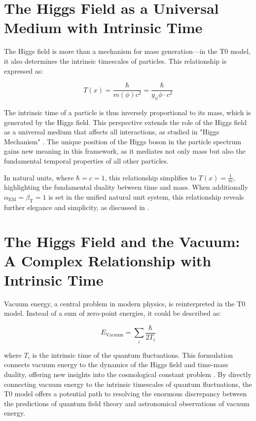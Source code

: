 \documentclass[a4paper,12pt]{article}
\newcommand{\Tfield}{T(x)}
\newcommand{\betaT}{\beta_{\text{T}}}
\newcommand{\alphaEM}{\alpha_{\text{EM}}}
\begin{document}
	\section{The Higgs Field as a Universal Medium with Intrinsic Time}
	
	The Higgs field is more than a mechanism for mass generation—in the T0 model, it also determines the intrinsic timescales of particles. This relationship is expressed as:
	
	\begin{equation}
		\Tfield = \frac{\hbar}{m(\phi) c^2} = \frac{\hbar}{y_\psi \phi \cdot c^2}
	\end{equation}
	
	The intrinsic time of a particle is thus inversely proportional to its mass, which is generated by the Higgs field. This perspective extends the role of the Higgs field as a universal medium that affects all interactions, as studied in "Higgs Mechanism" \cite{pascher_higgs_2025}. The unique position of the Higgs boson in the particle spectrum gains new meaning in this framework, as it mediates not only mass but also the fundamental temporal properties of all other particles.
	
	In natural units, where $\hbar = c = 1$, this relationship simplifies to $\Tfield = \frac{1}{m}$, highlighting the fundamental duality between time and mass. When additionally $\alphaEM = \betaT = 1$ is set in the unified natural unit system, this relationship reveals further elegance and simplicity, as discussed in \cite{pascher_alphabeta_2025}.
	
	\section{The Higgs Field and the Vacuum: A Complex Relationship with Intrinsic Time}
	
	Vacuum energy, a central problem in modern physics, is reinterpreted in the T0 model. Instead of a sum of zero-point energies, it could be described as:
	
	\begin{equation}
		E_\text{Vacuum} = \sum_i \frac{\hbar}{2 T_i}
	\end{equation}
	
	where $T_i$ is the intrinsic time of the quantum fluctuations. This formulation connects vacuum energy to the dynamics of the Higgs field and time-mass duality, offering new insights into the cosmological constant problem \cite{weinberg1989cosmological}. By directly connecting vacuum energy to the intrinsic timescales of quantum fluctuations, the T0 model offers a potential path to resolving the enormous discrepancy between the predictions of quantum field theory and astronomical observations of vacuum energy.
	
\end{document}
